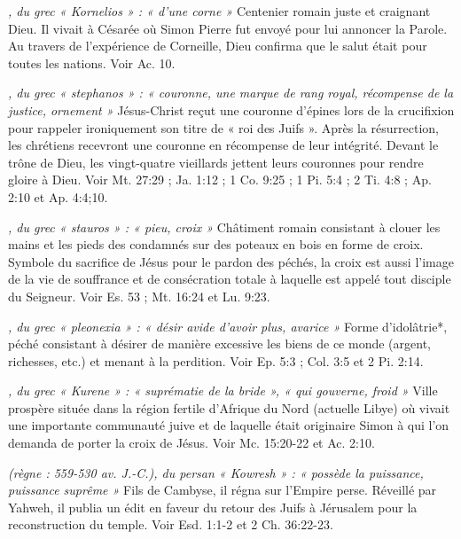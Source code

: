 \begin{multicols}{2}
\textit{, du grec « Kornelios » : « d'une corne »}\newline
Centenier romain juste et craignant Dieu. Il vivait à Césarée où Simon Pierre fut envoyé pour lui annoncer la Parole. Au travers de l'expérience de Corneille, Dieu confirma que le salut était pour toutes les nations. Voir Ac. 10.

\textit{, du grec « stephanos » : « couronne, une marque de rang royal, récompense de la justice, ornement »}\newline
Jésus-Christ reçut une couronne d'épines lors de la crucifixion pour rappeler ironiquement son titre de « roi des Juifs ». Après la résurrection, les chrétiens recevront une couronne en récompense de leur intégrité. Devant le trône de Dieu, les vingt-quatre vieillards jettent leurs couronnes pour rendre gloire à Dieu. Voir Mt. 27:29 ; Ja. 1:12 ; 1 Co. 9:25 ; 1 Pi. 5:4 ; 2 Ti. 4:8 ; Ap. 2:10 et Ap. 4:4;10.

\textit{, du grec « stauros » : « pieu, croix »}\newline
Châtiment romain consistant à clouer les mains et les pieds des condamnés sur des poteaux en bois en forme de croix. Symbole du sacrifice de Jésus pour le pardon des péchés, la croix est aussi l'image de la vie de souffrance et de consécration totale à laquelle est appelé tout disciple du Seigneur. Voir Es. 53 ; Mt. 16:24 et Lu. 9:23.

\textit{, du grec « pleonexia » : « désir avide d'avoir plus, avarice »}\newline
Forme d'idolâtrie*, péché consistant à désirer de manière excessive les biens de ce monde (argent, richesses, etc.) et menant à la perdition. Voir Ep. 5:3 ; Col. 3:5 et 2 Pi. 2:14.

\textit{, du grec « Kurene » : « suprématie de la bride », « qui gouverne, froid »}\newline
Ville prospère située dans la région fertile d'Afrique du Nord (actuelle Libye) où vivait une importante communauté juive et de laquelle était originaire Simon à qui l'on demanda de porter la croix de Jésus. Voir Mc. 15:20-22 et Ac. 2:10.

\textit{(règne : 559-530 av. J.-C.), du persan « Kowresh » : « possède la puissance, puissance suprême »}\newline
Fils de Cambyse, il régna sur l'Empire perse. Réveillé par Yahweh, il publia un édit en faveur du retour des Juifs à Jérusalem pour la reconstruction du temple. Voir Esd. 1:1-2 et 2 Ch. 36:22-23.


\end{multicols}
